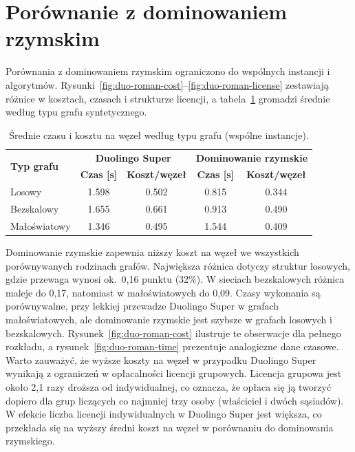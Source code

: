 \section{Porównanie z dominowaniem rzymskim}

Porównania z dominowaniem rzymskim ograniczono do wspólnych instancji i algorytmów. Rysunki~\ref{fig:duo-roman-cost}--\ref{fig:duo-roman-license} zestawiają różnice w kosztach, czasach i strukturze licencji, a tabela~\ref{tab:duo-roman-graph} gromadzi średnie według typu grafu syntetycznego.

\begin{table}[H]
  \centering
  \caption{Średnie czasu i kosztu na węzeł według typu grafu (wspólne instancje).}
  \label{tab:duo-roman-graph}
  \begin{tabular}{lcccc}
    \toprule
    \multirow{2}{*}{\textbf{Typ grafu}} & \multicolumn{2}{c}{\textbf{Duolingo Super}} & \multicolumn{2}{c}{\textbf{Dominowanie rzymskie}}                                            \\
                                        & \textbf{Czas [s]}                           & \textbf{Koszt/węzeł}                              & \textbf{Czas [s]} & \textbf{Koszt/węzeł} \\
    \midrule
    Losowy                              & 1.598                                       & 0.502                                             & 0.815             & 0.344                \\
    Bezskalowy                          & 1.655                                       & 0.661                                             & 0.913             & 0.490                \\
    Małoświatowy                        & 1.346                                       & 0.495                                             & 1.544             & 0.409                \\
    \bottomrule
  \end{tabular}
\end{table}

Dominowanie rzymskie zapewnia niższy koszt na węzeł we wszystkich porównywanych rodzinach grafów. Największa różnica dotyczy struktur losowych, gdzie przewaga wynosi ok.~0,16 punktu (32\%). W sieciach bezskalowych różnica maleje do 0,17, natomiast w małoświatowych do 0,09. Czasy wykonania są porównywalne, przy lekkiej przewadze Duolingo Super w grafach małoświatowych, ale dominowanie rzymskie jest szybsze w grafach losowych i bezskalowych. Rysunek~\ref{fig:duo-roman-cost} ilustruje te obserwacje dla pełnego rozkładu, a rysunek~\ref{fig:duo-roman-time} prezentuje analogiczne dane czasowe. Warto zauważyć, że wyższe koszty na węzeł w przypadku Duolingo Super wynikają z ograniczeń w opłacalności licencji grupowych. Licencja grupowa jest około 2,1 razy droższa od indywidualnej, co oznacza, że opłaca się ją tworzyć dopiero dla grup liczących co najmniej trzy osoby (właściciel i dwóch sąsiadów). W efekcie liczba licencji indywidualnych w Duolingo Super jest większa, co przekłada się na wyższy średni koszt na węzeł w porównaniu do dominowania rzymskiego.

